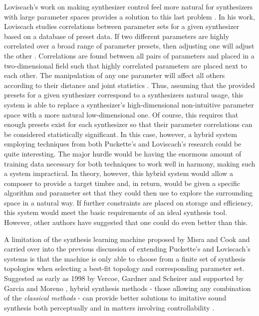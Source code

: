 \documentclass[a4paper,12pt]{report} 	%
\numberwithin{figure}{chapter}
\numberwithin{table}{chapter}
\numberwithin{equation}{chapter}
\begin{document}
\begin{flushleft}
Loviscach's work on making synthesizer control feel more natural for synthesizers with large parameter spaces provides a solution to this last problem \cite{Loviscach:2009mi}. In his work, Loviscach studies correlations between parameter sets for a given synthesizer based on a database of preset data. If two different parameters are highly correlated over a broad range of parameter presets, then adjusting one will adjust the other \cite[p. 1]{Loviscach:2009mi}. Correlations are found between all pairs of parameters and placed in a two-dimensional field such that highly correlated parameters are placed next to each other. The manipulation of any one parameter will affect all others according to their distance and joint statistics \cite[p. 1]{Loviscach:2009mi}. Thus, assuming that the provided presets for a given synthesizer correspond to a synthesizers natural usage, this system is able to replace a synthesizer's high-dimensional non-intuitive parameter space with a more natural low-dimensional one. Of course, this requires that enough presets exist for each synthesizer so that their parameter correlations can be considered statistically significant. In this case, however, a hybrid system employing techniques from both Puckette's and Loviscach's research could be quite interesting. The major hurdle would be having the enormous amount of training data necessary for both techniques to work well in harmony, making such a system impractical. In theory, however, this hybrid system would allow a composer to provide a target timbre and, in return, would be given a specific algorithm and parameter set that they could then use to explore the surrounding space in a natural way. If further constraints are placed on storage and efficiency, this system would meet the basic requirements of an ideal synthesis tool. However, other authors have suggested that one could do even better than this.

A limitation of the synthesis learning machine proposed by Misra and Cook  \cite[p. 1]{Misra:2009km} and carried over into the previous discussion of extending Puckette's and Loviscach's systems is that the machine is only able to choose from a finite set of synthesis topologies when selecting a best-fit topology and corresponding parameter set. Suggested as early as 1998 by Vercoe, Gardner and Scheirer and supported by Garcia \cite[p. 2]{Garcia:2000th} and Moreno \cite[p. 1]{Moreno:2005bs}, hybrid synthesis methods - those allowing any combination of the \emph{classical methods} - can provide better solutions to imitative sound synthesis both perceptually and in matters involving controllability \cite[p. 9]{Vercoe:1998hh}.


\end{flushleft}
\end{document}
